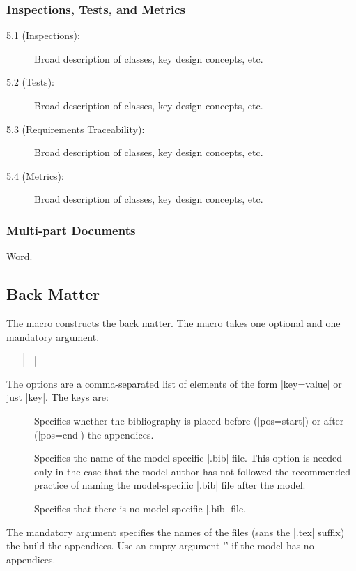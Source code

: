 \subsubsection{Inspections, Tests, and Metrics}
\label{sec:chapterfive}
\begin{description}
\item[5.1 (Inspections):] Broad description of classes, key design concepts, etc.
\item[5.2 (Tests):] Broad description of classes, key design concepts, etc.
\item[5.3 (Requirements Traceability):] Broad description of classes, key design concepts, etc.
\item[5.4 (Metrics):] Broad description of classes, key design concepts, etc.
\end{description}

\subsubsection{Multi-part Documents}
Word.

\subsection{Back Matter}
The  macro constructs the back matter.
The macro takes one optional and one mandatory argument.
\begin{quote}
||
\end{quote}
The options are a comma-separated list of elements of the form
|key=value| or just |key|. The keys are:
\begin{description}
\item[] Specifies whether the bibliography
is placed before (|pos=start|) or after (|pos=end|) the appendices.
\item[] Specifies the name of the model-specific
|.bib| file. This option is needed only in the case that the model author
has not followed the recommended practice of naming the model-specific
|.bib| file after the model.
\item[] Specifies that there is no model-specific
|.bib| file.
\end{description}

The mandatory argument specifies the names of the files (sans the |.tex| suffix)
the build the appendices.
Use an empty argument '{}' if the model has no appendices.

